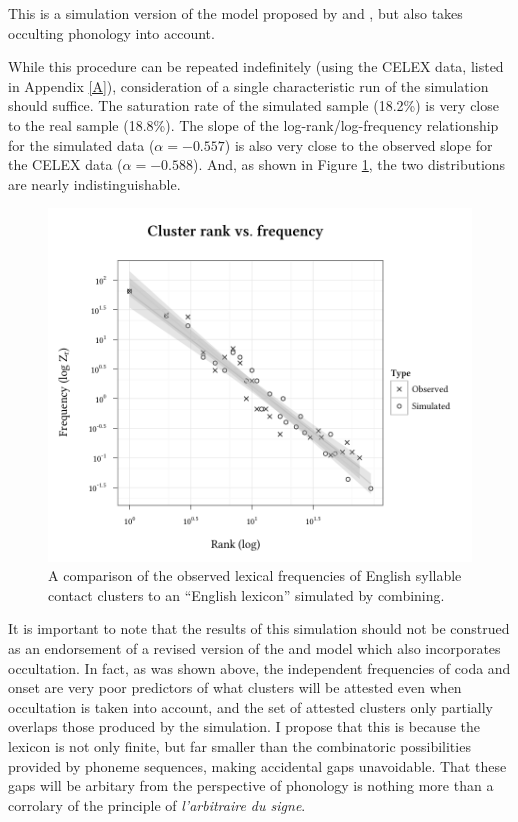 \noindent
This is a simulation version of the model proposed by \citet{Pierrehumbert1994} and \citet{Coleman1997}, but also takes occulting phonology into account. 

While this procedure can be repeated indefinitely (using the CELEX data, listed in Appendix \ref{A}), consideration of a single characteristic run of the simulation should suffice. The saturation rate of the simulated sample (18.2\%) is very close to the real sample (18.8\%). The slope of the log-rank/log-frequency relationship for the simulated data ($\alpha = -0.557$) is also very close to the observed slope for the CELEX data ($\alpha = -0.588$). And, as shown in Figure \ref{sim}, the two distributions are nearly indistinguishable. 

\begin{figure}
\centering
\includegraphics{sim.pdf}
\caption{A comparison of the observed lexical frequencies of English syllable contact clusters to an ``English lexicon'' simulated by combining.}
\label{sim}
\end{figure}

It is important to note that the results of this simulation should not be construed as an endorsement of a revised version of the \citet{Pierrehumbert1994} and \citet{Coleman1997} model which also incorporates occultation. In fact, as was shown above, the independent frequencies of coda and onset are very poor predictors of what clusters will be attested even when occultation is taken into account, and the set of attested clusters only partially overlaps those produced by the simulation. I propose that this is because the lexicon is not only finite, but far smaller than the combinatoric possibilities provided by phoneme sequences, making accidental gaps unavoidable. That these gaps will be arbitary from the perspective of phonology is nothing more than a corrolary of the principle of \emph{l'arbitraire du signe}. 

